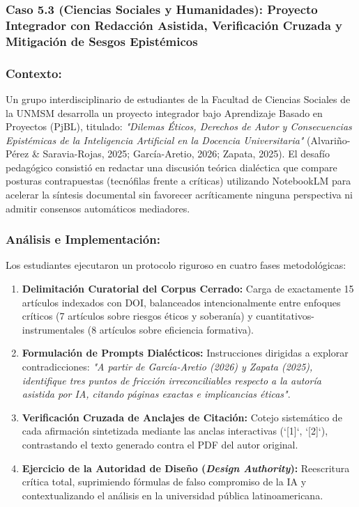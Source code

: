 \newpage
\subsubsection{Caso 5.3 (Ciencias Sociales y Humanidades): Proyecto Integrador con Redacción Asistida, Verificación Cruzada y Mitigación de Sesgos Epistémicos}

\subsubsection*{Contexto:}
Un grupo interdisciplinario de estudiantes de la Facultad de Ciencias Sociales de la UNMSM desarrolla un proyecto integrador bajo Aprendizaje Basado en Proyectos (PjBL), titulado: \textit{"Dilemas Éticos, Derechos de Autor y Consecuencias Epistémicas de la Inteligencia Artificial en la Docencia Universitaria"} (Alvariño-Pérez \& Saravia-Rojas, 2025; García-Aretio, 2026; Zapata, 2025). El desafío pedagógico consistió en redactar una discusión teórica dialéctica que compare posturas contrapuestas (tecnófilas frente a críticas) utilizando NotebookLM para acelerar la síntesis documental sin favorecer acríticamente ninguna perspectiva ni admitir consensos automáticos mediadores.

\subsubsection*{Análisis e Implementación:}
Los estudiantes ejecutaron un protocolo riguroso en cuatro fases metodológicas:
\begin{enumerate}[leftmargin=1.5em, itemsep=0.15em, topsep=0.15em]
    \item \textbf{Delimitación Curatorial del Corpus Cerrado:} Carga de exactamente 15 artículos indexados con DOI, balanceados intencionalmente entre enfoques críticos (7 artículos sobre riesgos éticos y soberanía) y cuantitativos-instrumentales (8 artículos sobre eficiencia formativa).
    \item \textbf{Formulación de Prompts Dialécticos:} Instrucciones dirigidas a explorar contradicciones: \textit{"A partir de García-Aretio (2026) y Zapata (2025), identifique tres puntos de fricción irreconciliables respecto a la autoría asistida por IA, citando páginas exactas e implicancias éticas"}.
    \item \textbf{Verificación Cruzada de Anclajes de Citación:} Cotejo sistemático de cada afirmación sintetizada mediante las anclas interactivas (`[1]`, `[2]`), contrastando el texto generado contra el PDF del autor original.
    \item \textbf{Ejercicio de la Autoridad de Diseño (\textit{Design Authority}):} Reescritura crítica total, suprimiendo fórmulas de falso compromiso de la IA y contextualizando el análisis en la universidad pública latinoamericana.
\end{enumerate}

